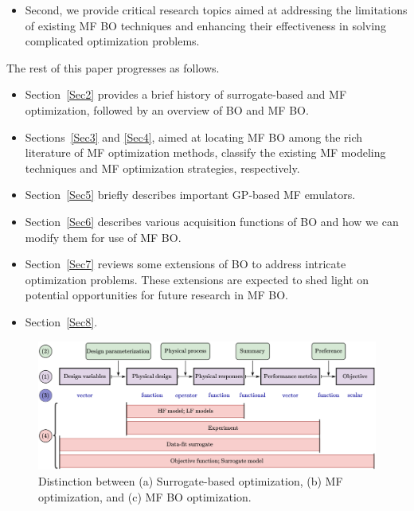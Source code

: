 \documentclass[iicol,sn-basic]{sn-jnl}%
\theoremstyle{thmstyleone}%
\theoremstyle{thmstyletwo}
\theoremstyle{thmstylethree}
\begin{document}
\begin{linenumbers}
\begin{itemize}
    \item Second, we provide critical research topics aimed at addressing the limitations of existing MF BO techniques and enhancing their effectiveness in solving complicated optimization problems.
	
\end{itemize} 

The rest of this paper progresses as follows.
\begin{itemize}
    \item Section~\ref{Sec2} provides a brief history of surrogate-based and MF optimization, followed by an overview of BO and MF BO.
	
    \item Sections~\ref{Sec3} and \ref{Sec4}, aimed at locating MF BO among the rich literature of MF optimization methods, classify the existing MF modeling techniques and MF optimization strategies, respectively.
	
    \item Section~\ref{Sec5} briefly describes important GP-based MF emulators.
	
    \item Section~\ref{Sec6} describes various acquisition functions of BO and how we can modify them for use of MF BO.
	
    \item Section~\ref{Sec7} reviews some extensions of BO to address intricate optimization problems. These extensions are expected to shed light on potential opportunities for future research in MF BO.
	
    \item Section~\ref{Sec8}.
	
\end{itemize} 


\begin{figure}
	\centering
	\includegraphics[scale=0.80]{Fig0.png}
	\caption{ Distinction between (a) Surrogate-based optimization, (b) MF optimization, and (c) MF BO optimization.}
	\label{Fig0}
\end{figure}


\end{linenumbers}
\end{document}
